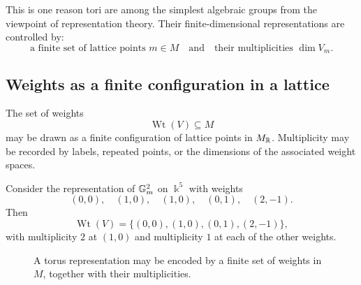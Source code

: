 \begin{observation}
This is one reason tori are among the simplest algebraic groups from
the viewpoint of representation theory. Their finite-dimensional
representations are controlled by:
\[
\text{a finite set of lattice points }m\in M
\quad\text{and}\quad
\text{their multiplicities }\dim V_m.
\]
\end{observation}

\subsection{Weights as a finite configuration in a lattice}

The set of weights
\[
\operatorname{Wt}(V)\subseteq M
\]
may be drawn as a finite configuration of lattice points in
\(M_{\mathbb{R}}\). Multiplicity may be recorded by labels, repeated points,
or the dimensions of the associated weight spaces.

\begin{example}
Consider the representation of \(\mathbb{G}_{m}^2\) on \(\Bbbk^5\) with weights
\[
(0,0),\quad(1,0),\quad(1,0),\quad(0,1),\quad(2,-1).
\]
Then
\[
\operatorname{Wt}(V)
=
\{(0,0),(1,0),(0,1),(2,-1)\},
\]
with multiplicity \(2\) at \((1,0)\) and multiplicity \(1\) at each of
the other weights.
\end{example}

\begin{figure}[ht]
\centering
{}
\caption{A torus representation may be encoded by a finite set of
weights in \(M\), together with their multiplicities.}
\label{fig:finite-weight-configuration}
\end{figure}

